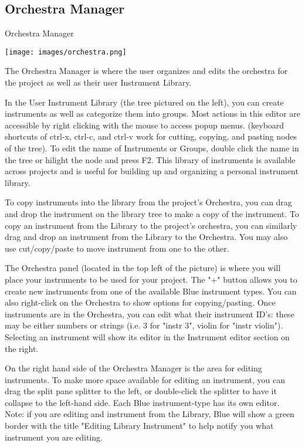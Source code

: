 \subsection{Orchestra Manager}\label{orchestraManager}

Orchestra Manager

\texttt{[image: images/orchestra.png]}

The Orchestra Manager is where the user organizes and edits the
orchestra for the project as well as their user Instrument Library.

In the User Instrument Library (the tree pictured on the left), you can
create instruments as well as categorize them into groups. Most actions
in this editor are accessible by right clicking with the mouse to access
popup menus. (keyboard shortcuts of ctrl-x, ctrl-c, and ctrl-v work for
cutting, copying, and pasting nodes of the tree). To edit the name of
Instruments or Groups, double click the name in the tree or hilight the
node and press F2. This library of instruments is available across
projects and is useful for building up and organizing a personal
instrument library.

To copy instruments into the library from the project's Orchestra, you
can drag and drop the instrument on the library tree to make a copy of
the instrument. To copy an instrument from the Library to the project's
orchestra, you can similarly drag and drop an instrument from the
Library to the Orchestra. You may also use cut/copy/paste to move
instrument from one to the other.

The Orchestra panel (located in the top left of the picture) is where
you will place your instruments to be used for your project. The "+"
button allows you to create new instruments from one of the available
Blue instrument types. You can also right-click on the Orchestra to show
options for copying/pasting. Once instruments are in the Orchestra, you
can edit what their instrument ID's: these may be either numbers or
strings (i.e. 3 for "instr 3", violin for "instr violin"). Selecting an
instrument will show its editor in the Instrument editor section on the
right.

On the right hand side of the Orchestra Manager is the area for editing
instruments. To make more space available for editing an instrument, you
can drag the split pane splitter to the left, or double-click the
splitter to have it collapse to the left-hand side. Each Blue
instrument-type has its own editor. Note: if you are editing and
instrument from the Library, Blue will show a green border with the
title "Editing Library Instrument" to help notify you what instrument
you are editing.

